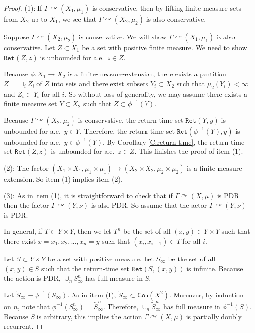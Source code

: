 \documentclass[12pt]{article}
\theoremstyle{plain}
\theoremstyle{definition}
\theoremstyle{remark}
\newcommand{\G}{\Gamma}
\newcommand\Ret{\mathtt{Ret}}
\def\cc{{\curvearrowright}}
\begin{document}
\begin{proof}
(1): If $\G \cc (X_1,\mu_1)$ is conservative, then by lifting finite measure sets from $X_2$ up to $X_1$, we see that $\G \cc (X_2,\mu_2)$ is also conservative. 

Suppose $\G \cc (X_2,\mu_2)$ is conservative. We will show $\G\cc (X_1,\mu_1)$ is also conservative. Let $Z \subset X_1$ be a set with positive finite measure. We need to show $\Ret(Z,z)$ is unbounded for a.e.\ $z\in Z$. 

Because $\phi:X_1 \to X_2$ is a finite-measure-extension, there exists a partition $Z=\sqcup_i Z_i$ of $Z$ into sets and there exist subsets $Y_i \subset X_2$ such that $\mu_2(Y_i)<\infty$ and $Z_i \subset Y_i$ for all $i$. So without loss of generality, we may assume there exists a finite measure set $Y \subset X_2$ such that $Z \subset \phi^{-1}(Y)$.

Because $\G \cc (X_2,\mu_2)$ is conservative, the return time set $\Ret(Y,y)$ is unbounded for a.e.\ $y\in Y$. Therefore, the return time set $\Ret(\phi^{-1}(Y),y)$ is unbounded for a.e.\ $y \in \phi^{-1}(Y)$. By Corollary \ref{C:return-time}, the return time set $\Ret(Z,z)$ is unbounded for a.e.\ $z\in Z$. This finishes the proof of item (1).

(2): The factor $(X_1\times X_1, \mu_1\times \mu_1) \to (X_2\times X_2,\mu_2\times \mu_2)$ is a finite measure extension. So item (1) implies item (2). 

(3): As in item (1), it is straightforward to check that if $\G \cc (X,\mu)$ is PDR then the factor $\G \cc (Y,\nu)$ is also PDR. So assume that the actor $\G \cc (Y,\nu)$ is PDR. 

In general, if $T \subset Y \times Y$, then we let $T^n$ be the set of all $(x,y)\in Y\times Y$ such that there exist $x=x_1,x_2,\ldots, x_n=y$ such that $(x_i,x_{i+1})\in T$ for all $i$.


Let $S \subset Y\times Y$ be a set with positive measure. Let $S_\infty$ be the set of all $(x,y)\in S$ such that the return-time set $\Ret(S,(x,y))$ is infinite. Because the action is PDR, $\cup_n S_\infty^n$ has full measure in $S$.

Let $\tilde{S}_\infty = \phi^{-1}(S_\infty)$. As in item (1), $\tilde{S}_\infty \subset \mathsf{Con}(X^2)$. Moreover, by induction on $n$, note that $\phi^{-1}(S^n_\infty) = \tilde{S}^n_\infty$. Therefore, $\cup_n \tilde{S}^n_\infty$ has full measure in $\phi^{-1}(S)$. Because $S$ is arbitrary, this implies the action $\G \cc (X,\mu)$ is partially doubly recurrent. 

\end{proof}
\end{document}
